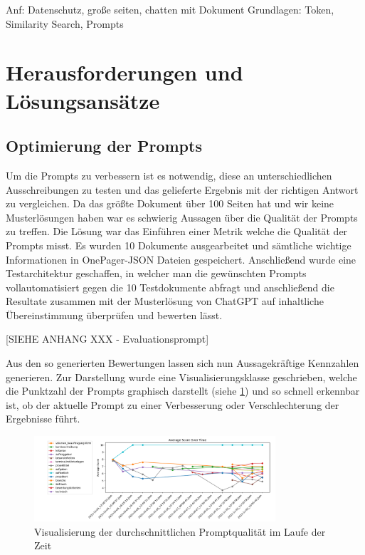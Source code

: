 Anf: Datenschutz, große seiten, chatten mit Dokument
Grundlagen: Token, Similarity Search, Prompts

\section{Herausforderungen und Lösungsansätze}

\subsection{Optimierung der Prompts}
Um die Prompts zu verbessern ist es notwendig, diese an unterschiedlichen Ausschreibungen zu testen und das gelieferte 
Ergebnis mit der richtigen Antwort zu vergleichen. Da das größte Dokument über 100 Seiten hat und wir keine Musterlösungen 
haben war es schwierig Aussagen über die Qualität der Prompts zu treffen. Die Lösung war das Einführen einer Metrik welche 
die Qualität der Prompts misst. Es wurden 10 Dokumente ausgearbeitet und sämtliche wichtige Informationen in OnePager-JSON Dateien 
gespeichert. Anschließend wurde eine Testarchitektur geschaffen, in welcher man die gewünschten Prompts vollautomatisiert 
gegen die 10 Testdokumente abfragt und anschließend die Resultate zusammen mit der Musterlösung von ChatGPT auf inhaltliche 
Übereinstimmung überprüfen und bewerten lässt.

[SIEHE ANHANG XXX - Evaluationsprompt]

Aus den so generierten Bewertungen lassen sich nun Aussagekräftige Kennzahlen 
generieren. Zur Darstellung wurde eine Visualisierungsklasse geschrieben, welche die Punktzahl der Prompts graphisch darstellt 
(siehe \ref{fig:03_Prompt_Evaluierung}) und so schnell erkennbar ist, ob der aktuelle Prompt zu einer Verbesserung 
oder Verschlechterung der Ergebnisse führt.

\begin{figure}[H]
    \centering
    \includegraphics[width=0.8\textwidth]{figures/03_Prompt_Evaluierung.png}
    \caption{Visualisierung der durchschnittlichen Promptqualität im Laufe der Zeit}
    \label{fig:03_Prompt_Evaluierung}    %
    \end{figure}

